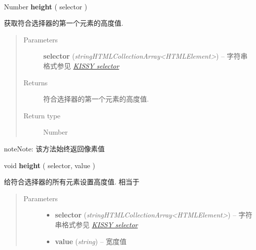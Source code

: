 \documentclass[letterpaper,10pt,english]{sphinxmanual}
\begin{document}
\begin{fulllineitems}
\label{api/core/dom/height:DOM.height}~
\begin{DUlineblock}{0em}
\item[] Number \textbf{height} ( selector )
\item[] 获取符合选择器的第一个元素的高度值.
\end{DUlineblock}
\begin{quote}\begin{description}
\item[{Parameters}] \leavevmode
\textbf{selector} (\emph{string\textbar{}HTMLCollection\textbar{}Array\textless{}HTMLElement\textgreater{}}) -- 字符串格式参见 {\hyperref[api/core/dom/selector:dom-selector]{\emph{KISSY selector}}}

\item[{Returns}] \leavevmode
符合选择器的第一个元素的高度值.

\item[{Return type}] \leavevmode
Number

\end{description}\end{quote}

\begin{notice}{note}{Note:}
该方法始终返回像素值
\end{notice}

\begin{DUlineblock}{0em}
\item[] void \textbf{height} ( selector, value )
\item[] 给符合选择器的所有元素设置高度值. 相当于 {\hyperref[api/core/dom/css:DOM.css]{}}
\end{DUlineblock}
\begin{quote}\begin{description}
\item[{Parameters}] \leavevmode\begin{itemize}
\item {}
\textbf{selector} (\emph{string\textbar{}HTMLCollection\textbar{}Array\textless{}HTMLElement\textgreater{}}) -- 字符串格式参见 {\hyperref[api/core/dom/selector:dom-selector]{\emph{KISSY selector}}}

\item {}
\textbf{value} (\emph{string}) -- 宽度值

\end{itemize}

\end{description}\end{quote}

\end{fulllineitems}
\end{document}
